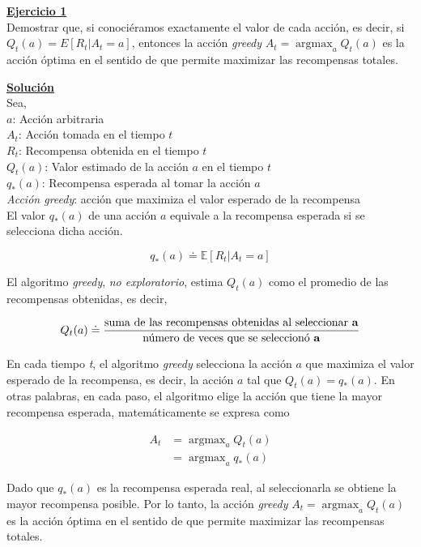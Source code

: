 \documentclass[12pt]{article}
\newlength\tindent
\renewcommand{\indent}{\hspace*{\tindent}}
\DeclareMathOperator*{\argmax}{argmax}
\begin{document}
    \indent\underline{\textbf{Ejercicio 1}}\\
    Demostrar que, si conociéramos exactamente el valor de cada acción, es decir, si $Q_{t} (a) = E \left[ R_{t} \big| A_{t}=a \right]$, entonces la acción \textit{greedy} $ A_{t} = \argmax_{a}Q_{t}(a) $ es la acción óptima en el sentido de que permite maximizar las recompensas totales.

    \indent\underline{\textbf{Solución}}\\
    Sea,\\
    $a$: Acción arbitraria \\
    $A_{t}$: Acción tomada en el tiempo $t$ \\
    $R_{t}$: Recompensa obtenida en el tiempo $t$ \\
    $Q_{t}(a)$: Valor estimado de la acción $a$ en el tiempo $t$ \\
    $q_{*}(a)$: Recompensa esperada al tomar la acción $a$ \\
    \textit{Acción greedy}: acción que maximiza el valor esperado de la recompensa \\

    El valor $q_{*}(a)$ de una acción $a$ equivale a la recompensa esperada si se selecciona dicha acción.

    \[ q_{*}(a) \doteq \mathbb{E} \left[ R_{t} \big| A_{t}=a \right] \]

    El algoritmo \textit{greedy}, \textit{no exploratorio}, estima $Q_{t}(a)$ como el promedio de las recompensas obtenidas, es decir,

    \[
        Q_{t}(a)
        \doteq
        \frac{\text{suma de las recompensas obtenidas al seleccionar \textbf{a}}}
        {\text{número de veces que se seleccionó \textbf{a}}}
    \]

    En cada tiempo \textit{t}, el algoritmo \textit{greedy} selecciona la acción $a$ que maximiza el valor esperado de la recompensa, es decir, la acción $a$ tal que $Q_{t}(a) = q_{*}(a)$.
    En otras palabras, en cada paso, el algoritmo elige la acción que tiene la mayor recompensa esperada, matemáticamente se expresa como

    \begin{align*}
        A_{t} &= \argmax_{a}Q_{t}(a) \\
        &= \argmax_{a}q_{*}(a)
    \end{align*}

    Dado que $q_{*}(a)$ es la recompensa esperada real, al seleccionarla se obtiene la mayor recompensa posible.
    Por lo tanto, la acción \textit{greedy} $ A_{t} = \argmax_{a}Q_{t}(a) $ es la acción óptima en el sentido de que permite maximizar las recompensas totales.
\end{document}
